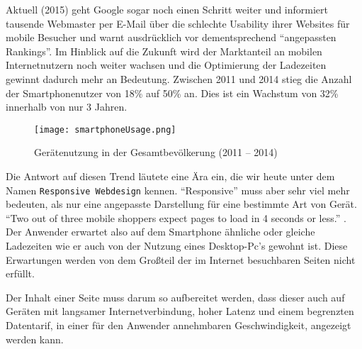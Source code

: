 	Aktuell (2015) geht Google sogar noch einen Schritt weiter und informiert tausende Webmaster per E-Mail über die schlechte Usability ihrer Websites für mobile Besucher und warnt ausdrücklich vor dementsprechend "`angepassten Rankings"'.\autocite{t3n15}
	Im Hinblick auf die Zukunft wird der Marktanteil an mobilen Internetnutzern noch weiter wachsen und die Optimierung der Ladezeiten gewinnt dadurch mehr an Bedeutung. Zwischen 2011 und 2014 stieg die Anzahl der Smartphonenutzer von 18\% auf 50\% an. Dies ist ein Wachstum von 32\% innerhalb von nur 3 Jahren.\autocite{tns14}\\

	\begin{figure}[htbp]
		\begin{center}
			\texttt{[image: smartphoneUsage.png]}
		\end{center}
		\caption{Gerätenutzung in der Gesamtbevölkerung (2011 – 2014)\autocite{tns14}}
		\label{fig:geraetenutzung}
	\end{figure}

	Die Antwort auf diesen Trend läutete eine Ära ein, die wir heute unter dem Namen \texttt{Responsive Webdesign} kennen. "`Responsive"' muss aber sehr viel mehr bedeuten, als nur eine angepasste Darstellung für eine bestimmte Art von Gerät. "`Two out of three mobile shoppers expect pages to load in 4 seconds or less."' \autocite{radware13}. Der Anwender erwartet also auf dem Smartphone ähnliche oder gleiche Ladezeiten wie er auch von der Nutzung eines Desktop-Pc's gewohnt ist. Diese Erwartungen werden von dem Großteil der im Internet besuchbaren Seiten nicht erfüllt. 


	Der Inhalt einer Seite muss darum so aufbereitet werden, dass dieser auch auf Geräten mit langsamer Internetverbindung, hoher Latenz und einem begrenzten Datentarif, in einer für den Anwender annehmbaren Geschwindigkeit, angezeigt werden kann.\\



